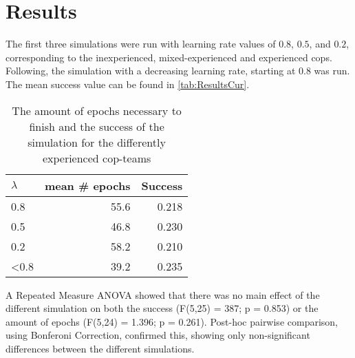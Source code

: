 \section{Results}
The first three simulations were run with learning rate values of $0.8$, $0.5$, and $0.2$, corresponding to the inexperienced, mixed-experienced and experienced cops. Following, the simulation with a decreasing learning rate, starting at $0.8$ was run. The mean success value can be found in \autoref{tab:ResultsCur}. 


\begin{table}
\begin{center}
\begin{tabular}{l r  r}
$\lambda$ & mean \# epochs & Success \\
\hline
0.8 & 55.6 & 0.218 \\
0.5 & 46.8 & 0.230 \\
0.2 & 58.2 & 0.210 \\
<0.8 & 39.2 & 0.235 \\
\hline
\end{tabular}
\caption{The amount of epochs necessary to finish and the success of the simulation for the differently experienced cop-teams}
\label{tab:ResultsCur}
\end{center}
\end{table}

A Repeated Measure ANOVA showed that there was no main effect of the different simulation on both the success (F(5,25) = 387; p = 0.853) or the amount of epochs (F(5,24) = 1.396; p = 0.261). Post-hoc pairwise comparison, using Bonferoni Correction, confirmed this, showing only non-significant differences between the different simulations.

 